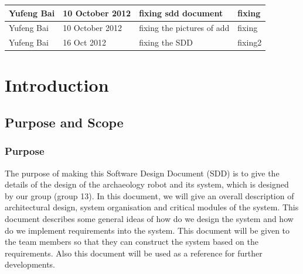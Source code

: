 \documentclass[11pt, a4paper]{report}
\begin{document}
\begin{tabular}{| l | l | l | l | }
Yufeng Bai	&	10 October 2012	&	fixing sdd document				&	fixing	\\ \hline
Yufeng Bai	&	10 October 2012	& fixing the pictures of add	&	fixing \\ \hline
Yufeng Bai	&	16 Oct 2012		& fixing the SDD			&	fixing2 \\ \hline
%





\end{tabular}
\clearpage


\chapter{Introduction}%
\label{cha:I}


\section{Purpose and Scope}
\subsection{Purpose}
The purpose of making this Software Design Document (SDD) is to give the details of the design of the archaeology robot and its system, which is designed by our group (group 13). In this document, we will give an overall description of architectural design, system organisation and critical modules of the system. This document describes some general ideas of how do we design the system and how do we implement requirements into the system. This document will be given to the team members so that they can construct the system based on the requirements. Also this document will be used as a reference for further developments.
\end{document}
